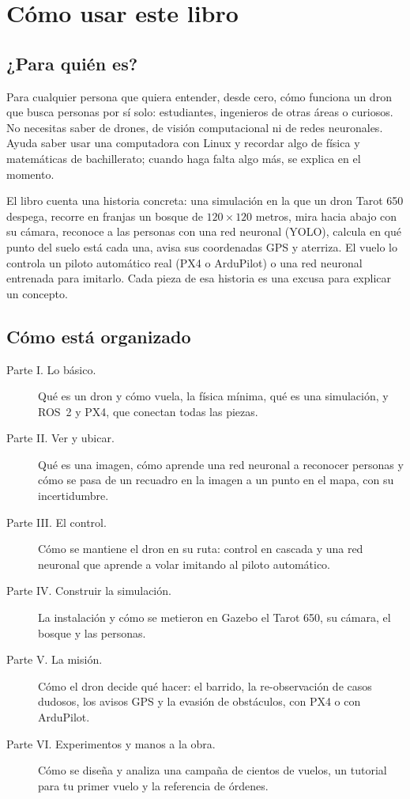 \chapter{Cómo usar este libro}

\section*{¿Para quién es?}

Para cualquier persona que quiera entender, desde cero, cómo funciona un dron que busca personas por
sí solo: estudiantes, ingenieros de otras áreas o curiosos. No necesitas saber de drones, de visión
computacional ni de redes neuronales. Ayuda saber usar una computadora con Linux y recordar algo de
física y matemáticas de bachillerato; cuando haga falta algo más, se explica en el momento.

El libro cuenta una historia concreta: una simulación en la que un dron Tarot 650 despega, recorre en
franjas un bosque de $120\times120$ metros, mira hacia abajo con su cámara, reconoce a las personas
con una red neuronal (YOLO), calcula en qué punto del suelo está cada una, avisa sus coordenadas GPS y
aterriza. El vuelo lo controla un piloto automático real (PX4 o ArduPilot) o una red neuronal
entrenada para imitarlo. Cada pieza de esa historia es una excusa para explicar un concepto.

\section*{Cómo está organizado}

\begin{description}
  \item[Parte I. Lo básico.] Qué es un dron y cómo vuela, la física mínima, qué es una simulación,
        y ROS~2 y PX4, que conectan todas las piezas.
  \item[Parte II. Ver y ubicar.] Qué es una imagen, cómo aprende una red neuronal a reconocer
        personas y cómo se pasa de un recuadro en la imagen a un punto en el mapa, con su incertidumbre.
  \item[Parte III. El control.] Cómo se mantiene el dron en su ruta: control en cascada y una red
        neuronal que aprende a volar imitando al piloto automático.
  \item[Parte IV. Construir la simulación.] La instalación y cómo se metieron en Gazebo el Tarot 650, su
        cámara, el bosque y las personas.
  \item[Parte V. La misión.] Cómo el dron decide qué hacer: el barrido, la re-observación de casos
        dudosos, los avisos GPS y la evasión de obstáculos, con PX4 o con ArduPilot.
  \item[Parte VI. Experimentos y manos a la obra.] Cómo se diseña y analiza una campaña de cientos de
        vuelos, un tutorial para tu primer vuelo y la referencia de órdenes.
\end{description}

